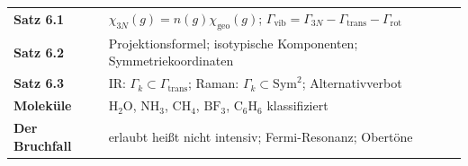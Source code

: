 \begin{merksatz}
\begin{center}
\renewcommand{\arraystretch}{1.5}
\begin{tabular}{@{}P{3.0cm}P{5.6cm}@{}}
\toprule
\textbf{Satz 6.1} & $\chi_{3N}(g) = n(g)\chi_{\mathrm{geo}}(g)$; $\Gamma_{\mathrm{vib}} = \Gamma_{3N} - \Gamma_{\mathrm{trans}} - \Gamma_{\mathrm{rot}}$\\
\textbf{Satz 6.2} & Projektionsformel; isotypische Komponenten; Symmetriekoordinaten\\
\textbf{Satz 6.3} & IR: $\Gamma_k\subset\Gamma_{\mathrm{trans}}$; Raman: $\Gamma_k\subset\mathrm{Sym}^{2}$; Alternativverbot\\
\textbf{Moleküle} & $\mathrm{H_2O}$, $\mathrm{NH_3}$, $\mathrm{CH_4}$, $\mathrm{BF_3}$, $\mathrm{C_6H_6}$ klassifiziert\\
\textbf{Der Bruchfall} & erlaubt heißt nicht intensiv; Fermi-Resonanz; Obertöne\\
\bottomrule
\end{tabular}
\end{center}

\begin{center}
\begin{minipage}{0.88\textwidth}
\end{minipage}
\end{center}
\end{merksatz}
